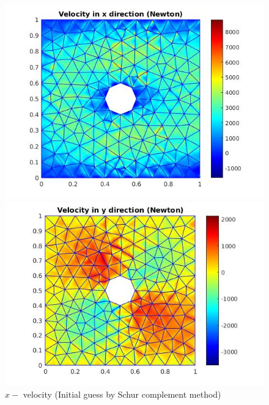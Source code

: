 \documentclass[a4paper]{book}
\begin{document}
\begin{figure}
  \begin{minipage}[c]{0.67\textwidth}
    \includegraphics[width=\textwidth]{cylinder_newton_vx_schur.jpg}
  \end{minipage}\hfill
  \begin{minipage}[c]{0.3\textwidth}
    \caption{$x-$ velocity (Initial guess by Schur complement method)}
  \label{x_vel_navier_stoke_schur}
  \end{minipage}
  \begin{minipage}[c]{0.67\textwidth}
    \includegraphics[width=\textwidth]{cylinder_newton_vy_schur.jpg}
  \end{minipage}\hfill
  \begin{minipage}[c]{0.3\textwidth}

\end{minipage}
\end{figure}
\end{document}
